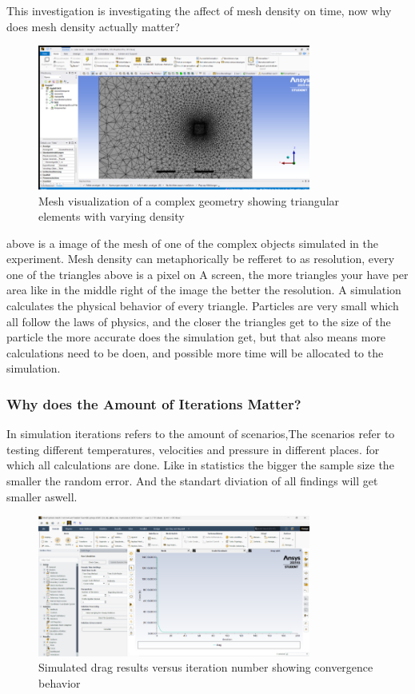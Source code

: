 \documentclass[12pt,a4paper]{article}
\begin{document}
This investigation is investigating the affect of mesh density on time, now why does mesh density actually matter?

\begin{figure}[H]
    \centering
    \includegraphics[width=0.8\textwidth]{image9.png}
    \caption{Mesh visualization of a complex geometry showing triangular elements with varying density}
    \label{fig:mesh_example}
\end{figure}

above is a image of the mesh of one of the complex objects simulated in the experiment. Mesh density can metaphorically be refferet to as resolution, every one of the triangles above is a pixel on A screen, the more triangles your have per area like in the middle right of the image the better the resolution. A simulation calculates the physical behavior of every triangle. Particles are very small which all follow the laws of physics, and the closer the triangles get to the size of the particle the more accurate does the simulation get, but that also means more calculations need to be doen, and possible more time will be allocated to the simulation.

\subsubsection{Why does the Amount of Iterations Matter?}

In simulation iterations refers to the amount of scenarios,The scenarios refer to testing different temperatures, velocities and pressure in different places. for which all calculations are done. Like in statistics the bigger the sample size the smaller the random error. And the standart diviation of all findings will get smaller aswell. 

\begin{figure}[H]
    \centering
    \includegraphics[width=0.8\textwidth]{image8.png}
    \caption{Simulated drag results versus iteration number showing convergence behavior}
    \label{fig:convergence}
\end{figure}
\end{document}
